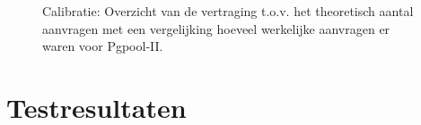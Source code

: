 \begin{figure}[h!] 
	\centering
	\caption{Calibratie: Overzicht van de vertraging t.o.v. het theoretisch aantal aanvragen met een vergelijking hoeveel werkelijke aanvragen er waren voor Pgpool-II. }
	\label{fig:calibratie-queriesperseconde-pgpool-ii}
\end{figure}

\section{Testresultaten}
